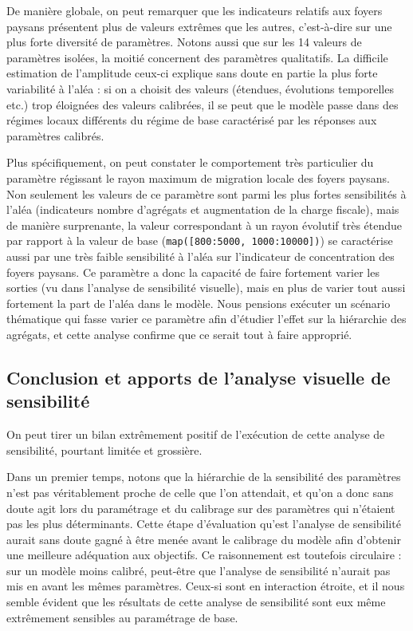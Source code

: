 De manière globale, on peut remarquer que les indicateurs relatifs aux foyers paysans présentent plus de valeurs extrêmes que les autres, c'est-à-dire sur une plus forte diversité de paramètres.
Notons aussi que sur les 14 valeurs de paramètres isolées, la moitié concernent des paramètres qualitatifs.
La difficile estimation de l'amplitude ceux-ci explique sans doute en partie la plus forte variabilité à l'aléa : si on a choisit des valeurs (étendues, évolutions temporelles etc.) trop éloignées des valeurs calibrées, il se peut que le modèle passe dans des régimes locaux différents du régime de base caractérisé par les réponses aux paramètres calibrés.

Plus spécifiquement, on peut constater le comportement très particulier du paramètre régissant le rayon maximum de migration locale des foyers paysans.
Non seulement les valeurs de ce paramètre sont parmi les plus fortes sensibilités à l'aléa (indicateurs nombre d'agrégats et augmentation de la charge fiscale), mais de manière surprenante, la valeur correspondant à un rayon évolutif très étendue par rapport à la valeur de base (\texttt{map([800:5000, 1000:10000])}) se caractérise aussi par une très faible sensibilité à l'aléa sur l'indicateur de concentration des foyers paysans.
Ce paramètre a donc la capacité de faire fortement varier les sorties (vu dans l'analyse de sensibilité visuelle), mais en plus de varier tout aussi fortement la part de l'aléa dans le modèle.
Nous pensions exécuter un scénario thématique qui fasse varier ce paramètre afin d'étudier l'effet sur la hiérarchie des agrégats, et cette analyse confirme que ce serait tout à faire approprié.

\subsection{Conclusion et apports de l'analyse visuelle de sensibilité}

On peut tirer un bilan extrêmement positif de l'exécution de cette analyse de sensibilité, pourtant limitée et grossière.

Dans un premier temps, notons que la hiérarchie de la sensibilité des paramètres n'est pas véritablement proche de celle que l'on attendait, et qu'on a donc sans doute agit lors du paramétrage et du calibrage sur des paramètres qui n'étaient pas les plus déterminants.
Cette étape d'évaluation qu'est l'analyse de sensibilité aurait sans doute gagné à être menée avant le calibrage du modèle afin d'obtenir une meilleure adéquation aux objectifs.
Ce raisonnement est toutefois circulaire : sur un modèle moins calibré, peut-être que l'analyse de sensibilité n'aurait pas mis en avant les mêmes paramètres.
Ceux-si sont en interaction étroite, et il nous semble évident que les résultats de cette analyse de sensibilité sont eux même extrêmement sensibles au paramétrage de base.

